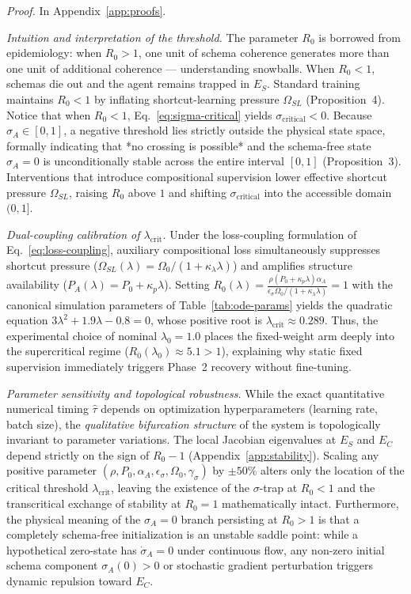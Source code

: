 \documentclass{article}
\theoremstyle{definition}
\begin{document}
\emph{Proof.} In Appendix~\ref{app:proofs}.

\noindent\emph{Intuition and interpretation of the threshold.} The parameter $R_0$ is borrowed from epidemiology: when $R_0 > 1$, one unit of schema coherence generates more than one unit of additional coherence --- understanding snowballs. When $R_0 < 1$, schemas die out and the agent remains trapped in $E_S$. Standard training maintains $R_0 < 1$ by inflating shortcut-learning pressure $\Omega_{SL}$ (Proposition~4). Notice that when $R_0 < 1$, Eq.~\eqref{eq:sigma-critical} yields $\sigma_{\text{critical}} < 0$. Because $\sigma_A \in [0, 1]$, a negative threshold lies strictly outside the physical state space, formally indicating that *no crossing is possible* and the schema-free state $\sigma_A = 0$ is unconditionally stable across the entire interval $[0, 1]$ (Proposition~3). Interventions that introduce compositional supervision lower effective shortcut pressure $\Omega_{SL}$, raising $R_0$ above $1$ and shifting $\sigma_{\text{critical}}$ into the accessible domain $(0, 1]$.

\noindent\emph{Dual-coupling calibration of $\lambda_{\text{crit}}$.} Under the loss-coupling formulation of Eq.~\eqref{eq:loss-coupling}, auxiliary compositional loss simultaneously suppresses shortcut pressure ($\Omega_{SL}(\lambda) = \Omega_0 / (1 + \kappa_\lambda \lambda)$) and amplifies structure availability ($P_A(\lambda) = P_0 + \kappa_p \lambda$). Setting $R_0(\lambda) = \frac{\rho (P_0 + \kappa_p \lambda) \alpha_A}{\epsilon_\sigma \Omega_0 / (1 + \kappa_\lambda \lambda)} = 1$ with the canonical simulation parameters of Table~\ref{tab:ode-params} yields the quadratic equation $3\lambda^2 + 1.9\lambda - 0.8 = 0$, whose positive root is $\lambda_{\text{crit}} \approx 0.289$. Thus, the experimental choice of nominal $\lambda_0 = 1.0$ places the fixed-weight arm deeply into the supercritical regime ($R_0(\lambda_0) \approx 5.1 > 1$), explaining why static fixed supervision immediately triggers Phase~2 recovery without fine-tuning.

\noindent\emph{Parameter sensitivity and topological robustness.} While the exact quantitative numerical timing $\hat{\tau}$ depends on optimization hyperparameters (learning rate, batch size), the \textit{qualitative bifurcation structure} of the system is topologically invariant to parameter variations. The local Jacobian eigenvalues at $E_S$ and $E_C$ depend strictly on the sign of $R_0 - 1$ (Appendix~\ref{app:stability}). Scaling any positive parameter $(\rho, P_0, \alpha_A, \epsilon_\sigma, \Omega_0, \gamma_\sigma)$ by $\pm 50\%$ alters only the location of the critical threshold $\lambda_{\text{crit}}$, leaving the existence of the $\sigma$-trap at $R_0 < 1$ and the transcritical exchange of stability at $R_0 = 1$ mathematically intact. Furthermore, the physical meaning of the $\sigma_A = 0$ branch persisting at $R_0 > 1$ is that a completely schema-free initialization is an unstable saddle point: while a hypothetical zero-state has $\dot{\sigma}_A = 0$ under continuous flow, any non-zero initial schema component $\sigma_A(0) > 0$ or stochastic gradient perturbation triggers dynamic repulsion toward $E_C$.
\end{document}
